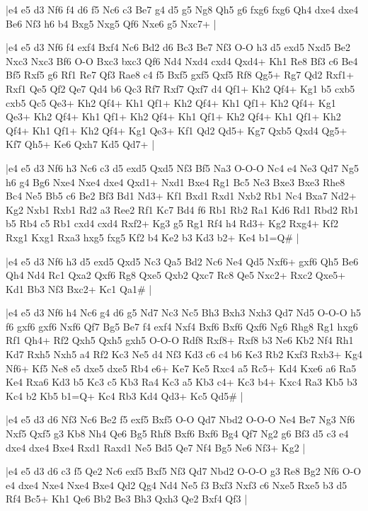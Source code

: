 \whitename{}
\blackname{}
\makegametitle
|e4 e5 d3 Nf6 f4 d6 f5 Nc6 c3 Be7 g4 d5 g5 Ng8 Qh5 g6 fxg6 fxg6 Qh4 dxe4 dxe4 Be6 Nf3 h6 b4 Bxg5 Nxg5 Qf6 Nxe6 g5 Nxc7+  |

\whitename{}
\blackname{}
\makegametitle
|e4 e5 d3 Nf6 f4 exf4 Bxf4 Nc6 Bd2 d6 Bc3 Be7 Nf3 O-O h3 d5 exd5 Nxd5 Be2 Nxc3 Nxc3 Bf6 O-O Bxc3 bxc3 Qf6 Nd4 Nxd4 cxd4 Qxd4+ Kh1 Re8 Bf3 c6 Be4 Bf5 Rxf5 g6 Rf1 Re7 Qf3 Rae8 c4 f5 Bxf5 gxf5 Qxf5 Rf8 Qg5+ Rg7 Qd2 Rxf1+ Rxf1 Qe5 Qf2 Qe7 Qd4 b6 Qc3 Rf7 Rxf7 Qxf7 d4 Qf1+ Kh2 Qf4+ Kg1 b5 cxb5 cxb5 Qc5 Qe3+ Kh2 Qf4+ Kh1 Qf1+ Kh2 Qf4+ Kh1 Qf1+ Kh2 Qf4+ Kg1 Qe3+ Kh2 Qf4+ Kh1 Qf1+ Kh2 Qf4+ Kh1 Qf1+ Kh2 Qf4+ Kh1 Qf1+ Kh2 Qf4+ Kh1 Qf1+ Kh2 Qf4+ Kg1 Qe3+ Kf1 Qd2 Qd5+ Kg7 Qxb5 Qxd4 Qg5+ Kf7 Qh5+ Ke6 Qxh7 Kd5 Qd7+  |

\whitename{}
\blackname{}
\makegametitle
|e4 e5 d3 Nf6 h3 Nc6 c3 d5 exd5 Qxd5 Nf3 Bf5 Na3 O-O-O Nc4 e4 Ne3 Qd7 Ng5 h6 g4 Bg6 Nxe4 Nxe4 dxe4 Qxd1+ Nxd1 Bxe4 Rg1 Bc5 Ne3 Bxe3 Bxe3 Rhe8 Bc4 Ne5 Bb5 c6 Be2 Bf3 Bd1 Nd3+ Kf1 Bxd1 Rxd1 Nxb2 Rb1 Nc4 Bxa7 Nd2+ Kg2 Nxb1 Rxb1 Rd2 a3 Ree2 Rf1 Kc7 Bd4 f6 Rb1 Rb2 Ra1 Kd6 Rd1 Rbd2 Rb1 b5 Rb4 c5 Rb1 cxd4 cxd4 Rxf2+ Kg3 g5 Rg1 Rf4 h4 Rd3+ Kg2 Rxg4+ Kf2 Rxg1 Kxg1 Rxa3 hxg5 fxg5 Kf2 b4 Ke2 b3 Kd3 b2+ Ke4 b1=Q\#  |

\whitename{}
\blackname{}
\makegametitle
|e4 e5 d3 Nf6 h3 d5 exd5 Qxd5 Nc3 Qa5 Bd2 Nc6 Ne4 Qd5 Nxf6+ gxf6 Qh5 Be6 Qh4 Nd4 Rc1 Qxa2 Qxf6 Rg8 Qxe5 Qxb2 Qxc7 Rc8 Qe5 Nxc2+ Rxc2 Qxe5+ Kd1 Bb3 Nf3 Bxc2+ Kc1 Qa1\#  |

\whitename{}
\blackname{}
\makegametitle
|e4 e5 d3 Nf6 h4 Nc6 g4 d6 g5 Nd7 Nc3 Nc5 Bh3 Bxh3 Nxh3 Qd7 Nd5 O-O-O h5 f6 gxf6 gxf6 Nxf6 Qf7 Bg5 Be7 f4 exf4 Nxf4 Bxf6 Bxf6 Qxf6 Ng6 Rhg8 Rg1 hxg6 Rf1 Qh4+ Rf2 Qxh5 Qxh5 gxh5 O-O-O Rdf8 Rxf8+ Rxf8 b3 Ne6 Kb2 Nf4 Rh1 Kd7 Rxh5 Nxh5 a4 Rf2 Kc3 Ne5 d4 Nf3 Kd3 c6 c4 b6 Ke3 Rb2 Kxf3 Rxb3+ Kg4 Nf6+ Kf5 Ne8 e5 dxe5 dxe5 Rb4 e6+ Ke7 Ke5 Rxc4 a5 Rc5+ Kd4 Kxe6 a6 Ra5 Ke4 Rxa6 Kd3 b5 Kc3 c5 Kb3 Ra4 Kc3 a5 Kb3 c4+ Kc3 b4+ Kxc4 Ra3 Kb5 b3 Kc4 b2 Kb5 b1=Q+ Kc4 Rb3 Kd4 Qd3+ Kc5 Qd5\#  |

\whitename{}
\blackname{}
\makegametitle
|e4 e5 d3 d6 Nf3 Nc6 Be2 f5 exf5 Bxf5 O-O Qd7 Nbd2 O-O-O Ne4 Be7 Ng3 Nf6 Nxf5 Qxf5 g3 Kb8 Nh4 Qe6 Bg5 Rhf8 Bxf6 Bxf6 Bg4 Qf7 Ng2 g6 Bf3 d5 c3 e4 dxe4 dxe4 Bxe4 Rxd1 Raxd1 Ne5 Bd5 Qe7 Nf4 Bg5 Ne6 Nf3+ Kg2  |

\whitename{}
\blackname{}
\makegametitle
|e4 e5 d3 d6 c3 f5 Qe2 Nc6 exf5 Bxf5 Nf3 Qd7 Nbd2 O-O-O g3 Re8 Bg2 Nf6 O-O e4 dxe4 Nxe4 Nxe4 Bxe4 Qd2 Qg4 Nd4 Ne5 f3 Bxf3 Nxf3 c6 Nxe5 Rxe5 b3 d5 Rf4 Bc5+ Kh1 Qe6 Bb2 Be3 Bh3 Qxh3 Qe2 Bxf4 Qf3  |

